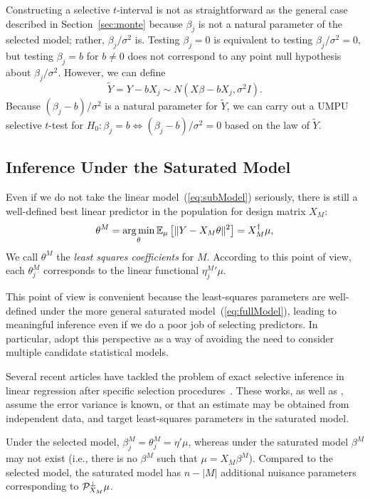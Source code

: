 \documentclass{article}
\theoremstyle{definition}
\newcommand{\bX}{X}
\newcommand{\proj}{\cP}
\begin{document}
Constructing a selective $t$-interval is not as straightforward as the general case described in Section~\ref{sec:monte} because $\beta_j$ is not a natural parameter of the selected model; rather, $\beta_j/\sigma^2$ is. Testing $\beta_j=0$ is equivalent to testing $\beta_j/\sigma^2=0$, but testing $\beta_j=b$ for $b\neq 0$ does not correspond to any point null hypothesis about $\beta_j/\sigma^2$. However, we can define
\begin{equation}
  \widetilde Y = Y-b X_j\sim N(\bX \beta - bX_j, \sigma^2I).
\end{equation}
Because $(\beta_j-b)/\sigma^2$ is a natural parameter for $\widetilde Y$, we can carry out a UMPU selective $t$-test for $H_0:\beta_j=b \iff (\beta_j-b)/\sigma^2=0$ based on the law of $\widetilde Y$.


\subsection{Inference Under the Saturated Model}\label{sec:fullModel}

Even if we do not take the linear model~(\ref{eq:subModel}) seriously, there is still a well-defined best linear predictor in the population for design matrix $\bX_M$:
\begin{equation}
  \theta^{M}=
  \argmin_\theta \E_\mu\left[ \|Y - \bX_M\theta\|^2\right]
  = \bX_M^\dagger \mu,
\end{equation}
We call $\theta^{M}$ the {\em least squares coefficients} for $M$. According to this point of view, each $\theta_j^{M}$ corresponds to the linear functional ${\eta_j^M}'\mu$.

This point of view is convenient because the least-squares parameters are well-defined under the more general saturated model~(\ref{eq:fullModel}), leading to meaningful inference even if we do a poor job of selecting predictors. In particular, \citet{berk2013valid} adopt this perspective as a way of avoiding the need to consider multiple candidate statistical models.

Several recent articles have tackled the problem of exact selective inference in linear regression after specific selection procedures~\citep{lee2016exact,loftus2014significance,lee2014marginal}. These works, as well as \citet{berk2013valid}, assume the error variance is known, or that an estimate may be obtained from independent data, and target least-squares parameters in the saturated model.

Under the selected model, $\beta_j^{M} = \theta_j^{M} = \eta'\mu$, whereas under the saturated model $\beta^{M}$ may not exist (i.e., there is no $\beta^M$ such that $\mu = \bX_M\beta^M$). Compared to the selected model, the saturated model has $n-|M|$ additional nuisance parameters corresponding to $\proj_{\bX_M}^\perp \mu$.
\end{document}
